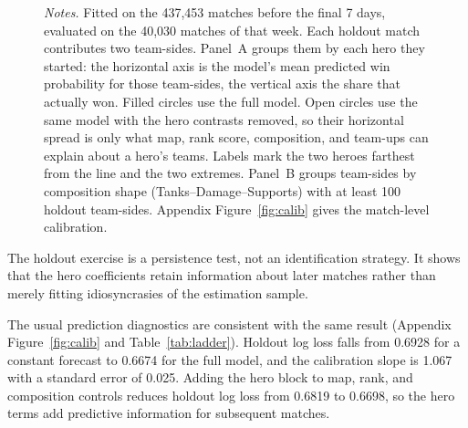 \documentclass[11pt]{article}
\begin{document}
\begin{figure}[!htb]

\begin{minipage}{0.95\linewidth}\footnotesize\vspace{4pt}
\emph{Notes.} Fitted on the 437,453 matches before the final 7 days, evaluated
on the 40,030 matches of that week. Each holdout match contributes two team-sides. Panel~A
groups them by each hero they started: the horizontal axis is the model's mean predicted win
probability for those team-sides, the vertical axis the share that actually won. Filled circles
use the full model. Open circles use the same model with the hero contrasts removed, so their
horizontal spread is only what map, rank score, composition, and team-ups can explain about a
hero's teams. Labels mark the two heroes farthest from the line and the two extremes. Panel~B
groups team-sides by composition shape (Tanks--Damage--Supports) with at least 100 holdout
team-sides. Appendix Figure~\ref{fig:calib} gives the match-level calibration.
\end{minipage}
\end{figure}

The holdout exercise is a persistence test, not an identification strategy. It shows that the hero
coefficients retain information about later matches rather than merely fitting idiosyncrasies of
the estimation sample.

The usual prediction diagnostics are consistent with the same result (Appendix
Figure~\ref{fig:calib} and Table~\ref{tab:ladder}). Holdout log loss falls from 0.6928 for a
constant forecast to 0.6674 for the full model, and the calibration slope is 1.067
with a standard error of 0.025. Adding the hero block to map, rank, and composition
controls reduces holdout log loss from 0.6819 to 0.6698, so the hero terms add
predictive information for subsequent matches.
\end{document}
